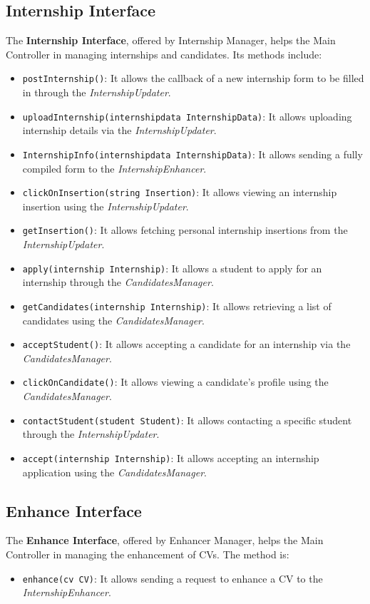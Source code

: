 \subsection{Internship Interface}
The \textbf{Internship Interface}, offered by Internship Manager, helps the Main Controller in managing internships and candidates. Its methods include:
\begin{itemize}
    \item \texttt{postInternship()}: It allows the callback of a new internship form to be filled in through the \textit{InternshipUpdater}.
    \item \texttt{uploadInternship(internshipdata InternshipData)}: It allows uploading internship details via the \textit{InternshipUpdater}.
    \item \texttt{InternshipInfo(internshipdata InternshipData)}: It allows sending a fully compiled form to the \textit{InternshipEnhancer}.
    \item \texttt{clickOnInsertion(string Insertion)}: It allows viewing an internship insertion using the \textit{InternshipUpdater}.
    \item \texttt{getInsertion()}: It allows fetching personal internship insertions from the \textit{InternshipUpdater}.
    \item \texttt{apply(internship Internship)}: It allows a student to apply for an internship through the \textit{CandidatesManager}.
    \item \texttt{getCandidates(internship Internship)}: It allows retrieving a list of candidates using the \textit{CandidatesManager}.
    \item \texttt{acceptStudent()}: It allows accepting a candidate for an internship via the \textit{CandidatesManager}.
    \item \texttt{clickOnCandidate()}: It allows viewing a candidate’s profile using the \textit{CandidatesManager}.
    \item \texttt{contactStudent(student Student)}: It allows contacting a specific student through the \textit{InternshipUpdater}.
    \item \texttt{accept(internship Internship)}: It allows accepting an internship application using the \textit{CandidatesManager}.
\end{itemize}

\subsection{Enhance Interface}
The \textbf{Enhance Interface}, offered by Enhancer Manager, helps the Main Controller in  managing the enhancement of CVs. The method is:
\begin{itemize}
    \item \texttt{enhance(cv CV)}: It allows sending a request to enhance a CV to the \textit{InternshipEnhancer}.
\end{itemize}

